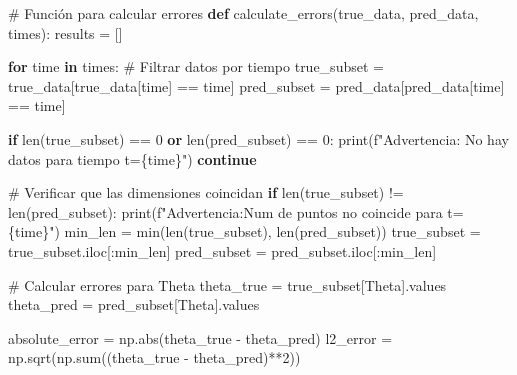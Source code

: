 \documentclass[
  spanish,
  us-letterpaper,
]{scrreprt}
\newenvironment{Shaded}{\begin{snugshade}}{\end{snugshade}}
\newcommand{\BuiltInTok}[1]{\textcolor[rgb]{0.00,0.23,0.31}{#1}}
\newcommand{\CommentTok}[1]{\textcolor[rgb]{0.37,0.37,0.37}{#1}}
\newcommand{\ControlFlowTok}[1]{\textcolor[rgb]{0.00,0.23,0.31}{\textbf{#1}}}
\newcommand{\DecValTok}[1]{\textcolor[rgb]{0.68,0.00,0.00}{#1}}
\newcommand{\KeywordTok}[1]{\textcolor[rgb]{0.00,0.23,0.31}{\textbf{#1}}}
\newcommand{\NormalTok}[1]{\textcolor[rgb]{0.00,0.23,0.31}{#1}}
\newcommand{\OperatorTok}[1]{\textcolor[rgb]{0.37,0.37,0.37}{#1}}
\newcommand{\SpecialCharTok}[1]{\textcolor[rgb]{0.37,0.37,0.37}{#1}}
\newcommand{\SpecialStringTok}[1]{\textcolor[rgb]{0.13,0.47,0.30}{#1}}
\newcommand{\StringTok}[1]{\textcolor[rgb]{0.13,0.47,0.30}{#1}}
\theoremstyle{definition}
\theoremstyle{plain}
\theoremstyle{remark}
\begin{document}
\begin{Shaded}
\begin{Highlighting}[]
\CommentTok{\# Función para calcular errores}
\KeywordTok{def}\NormalTok{ calculate\_errors(true\_data, pred\_data, times):}
\NormalTok{    results }\OperatorTok{=}\NormalTok{ []}
    
    \ControlFlowTok{for}\NormalTok{ time }\KeywordTok{in}\NormalTok{ times:}
        \CommentTok{\# Filtrar datos por tiempo}
\NormalTok{        true\_subset }\OperatorTok{=}\NormalTok{ true\_data[true\_data[}\StringTok{\textquotesingle{}time\textquotesingle{}}\NormalTok{] }\OperatorTok{==}\NormalTok{ time]}
\NormalTok{        pred\_subset }\OperatorTok{=}\NormalTok{ pred\_data[pred\_data[}\StringTok{\textquotesingle{}time\textquotesingle{}}\NormalTok{] }\OperatorTok{==}\NormalTok{ time]}
        
        \ControlFlowTok{if} \BuiltInTok{len}\NormalTok{(true\_subset) }\OperatorTok{==} \DecValTok{0} \KeywordTok{or} \BuiltInTok{len}\NormalTok{(pred\_subset) }\OperatorTok{==} \DecValTok{0}\NormalTok{:}
            \BuiltInTok{print}\NormalTok{(}\SpecialStringTok{f"Advertencia: No hay datos para tiempo t=}\SpecialCharTok{\{}\NormalTok{time}\SpecialCharTok{\}}\SpecialStringTok{"}\NormalTok{)}
            \ControlFlowTok{continue}
        
        \CommentTok{\# Verificar que las dimensiones coincidan}
        \ControlFlowTok{if} \BuiltInTok{len}\NormalTok{(true\_subset) }\OperatorTok{!=} \BuiltInTok{len}\NormalTok{(pred\_subset):}
            \BuiltInTok{print}\NormalTok{(}\SpecialStringTok{f"Advertencia:Num de puntos no coincide para t=}\SpecialCharTok{\{}\NormalTok{time}\SpecialCharTok{\}}\SpecialStringTok{"}\NormalTok{)}
\NormalTok{            min\_len }\OperatorTok{=} \BuiltInTok{min}\NormalTok{(}\BuiltInTok{len}\NormalTok{(true\_subset), }\BuiltInTok{len}\NormalTok{(pred\_subset))}
\NormalTok{            true\_subset }\OperatorTok{=}\NormalTok{ true\_subset.iloc[:min\_len]}
\NormalTok{            pred\_subset }\OperatorTok{=}\NormalTok{ pred\_subset.iloc[:min\_len]}
        
        \CommentTok{\# Calcular errores para Theta}
\NormalTok{        theta\_true }\OperatorTok{=}\NormalTok{ true\_subset[}\StringTok{\textquotesingle{}Theta\textquotesingle{}}\NormalTok{].values}
\NormalTok{        theta\_pred }\OperatorTok{=}\NormalTok{ pred\_subset[}\StringTok{\textquotesingle{}Theta\textquotesingle{}}\NormalTok{].values}
        
\NormalTok{        absolute\_error }\OperatorTok{=}\NormalTok{ np.}\BuiltInTok{abs}\NormalTok{(theta\_true }\OperatorTok{{-}}\NormalTok{ theta\_pred)}
\NormalTok{        l2\_error }\OperatorTok{=}\NormalTok{ np.sqrt(np.}\BuiltInTok{sum}\NormalTok{((theta\_true }\OperatorTok{{-}}\NormalTok{ theta\_pred)}\OperatorTok{**}\DecValTok{2}\NormalTok{))}
        

\end{Highlighting}
\end{Shaded}
\end{document}
